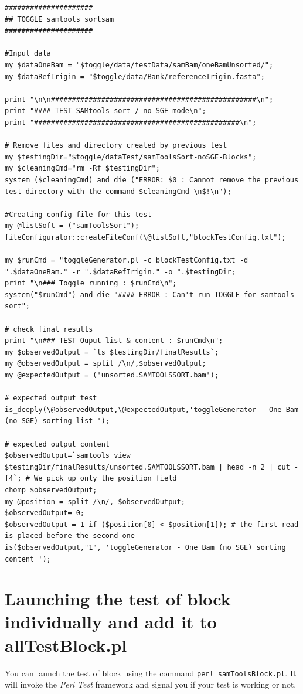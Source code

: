 \documentclass[a4paper,10pt]{report}
\begin{document}
\begin{lstlisting}
#####################
## TOGGLE samtools sortsam
#####################

#Input data
my $dataOneBam = "$toggle/data/testData/samBam/oneBamUnsorted/";
my $dataRefIrigin = "$toggle/data/Bank/referenceIrigin.fasta";

print "\n\n#################################################\n";
print "#### TEST SAMtools sort / no SGE mode\n";
print "#################################################\n";

# Remove files and directory created by previous test
my $testingDir="$toggle/dataTest/samToolsSort-noSGE-Blocks";
my $cleaningCmd="rm -Rf $testingDir";
system ($cleaningCmd) and die ("ERROR: $0 : Cannot remove the previous test directory with the command $cleaningCmd \n$!\n");

#Creating config file for this test
my @listSoft = ("samToolsSort");
fileConfigurator::createFileConf(\@listSoft,"blockTestConfig.txt");

my $runCmd = "toggleGenerator.pl -c blockTestConfig.txt -d ".$dataOneBam." -r ".$dataRefIrigin." -o ".$testingDir;
print "\n### Toggle running : $runCmd\n";
system("$runCmd") and die "#### ERROR : Can't run TOGGLE for samtools sort";

# check final results
print "\n### TEST Ouput list & content : $runCmd\n";
my $observedOutput = `ls $testingDir/finalResults`;
my @observedOutput = split /\n/,$observedOutput;
my @expectedOutput = ('unsorted.SAMTOOLSSORT.bam');

# expected output test
is_deeply(\@observedOutput,\@expectedOutput,'toggleGenerator - One Bam (no SGE) sorting list ');

# expected output content
$observedOutput=`samtools view $testingDir/finalResults/unsorted.SAMTOOLSSORT.bam | head -n 2 | cut -f4`; # We pick up only the position field
chomp $observedOutput;
my @position = split /\n/, $observedOutput;
$observedOutput= 0;
$observedOutput = 1 if ($position[0] < $position[1]); # the first read is placed before the second one
is($observedOutput,"1", 'toggleGenerator - One Bam (no SGE) sorting content ');
\end{lstlisting}


\section{Launching the test of block individually and add it to allTestBlock.pl}

You can launch the test of block using the command \texttt{perl samToolsBlock.pl}. It will invoke the \textit{Perl Test} framework and signal you if your test is working or not. \\
\end{document}
